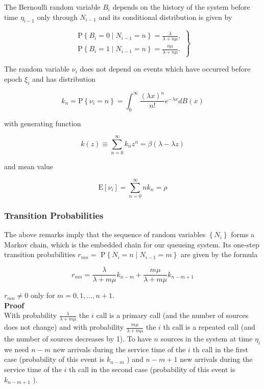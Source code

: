 \documentclass[10pt]{article}
\begin{document}
The Bernoulli random variable $B_{i}$ depends on the history of the system before time $\eta_{i-1}$ only through $N_{i-1}$ and its conditional distribution is given by

\[
\left.\begin{array}{l}
\mathrm{P}\left\{B_{i}=0 \mid N_{i-1}=n\right\}=\frac{\lambda}{\lambda+n \mu}, \\
\mathrm{P}\left\{B_{i}=1 \mid N_{i-1}=n\right\}=\frac{n \mu}{\lambda+n \mu} .
\end{array}\right\}
\]

The random variable $\nu_{i}$ does not depend on events which have occurred before epoch $\xi_{i}$ and has distribution


\begin{equation*}
k_{n}=\mathrm{P}\left\{\nu_{i}=n\right\}=\int_{0}^{\infty} \frac{(\lambda x)^{n}}{n !} e^{-\lambda x} d B(x) 
\end{equation*}


with generating function

$$
k(z) \equiv \sum_{n=0}^{\infty} k_{n} z^{n}=\beta(\lambda-\lambda z)
$$

and mean value


\begin{equation*}
\mathrm{E} [\nu_{i}]=\sum_{n=0}^{\infty} n k_{n}=\rho 
\end{equation*}

\subsubsection{Transition Probabilities}

The above remarks imply that the sequence of random variables $\left\{N_{i}\right\}$ forms a Markov chain, which is the embedded chain for our queueing system. Its one-step transition probabilities $r_{m n}=$ $\mathrm{P}\left\{N_{i}=n \mid N_{i-1}=m\right\}$ are given by the formula


\begin{equation*}
r_{m n}=\frac{\lambda}{\lambda+m \mu} k_{n-m}+\frac{m \mu}{\lambda+m \mu} k_{n-m+1} 
\end{equation*}


$r_{m n} \neq 0$ only for $m=0,1, \ldots, n+1$. \\

\textbf{Proof} \\ 
With probability $\frac{\lambda}{\lambda+m \mu}$ the $i$ call is a primary call (and the number of sources does not change) and with probability $\frac{m \mu}{\lambda+m \mu}$ the $i$ th call is a repeated call (and the number of sources decreases by 1). To have $n$ sources in the system at time $\eta_{i}$ we need $n-m$ new arrivals during the service time of the $i$ th call in the first case (probability of this event is $k_{n-m}$ ) and $n-m+1$ new arrivals during the service time of the $i$ th call in the second case (probability of this event is $k_{n-m+1}$ ).
\end{document}
